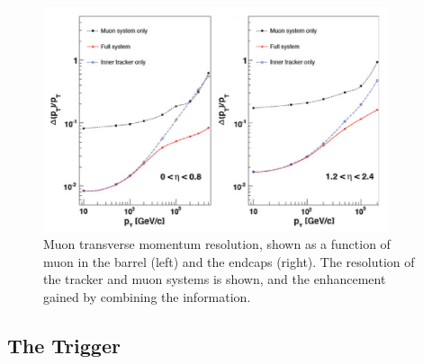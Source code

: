 \begin{figure}[htbp]
  \begin{center}
  \includegraphics[width=0.9\textwidth]{Figures/detector/CMSmuonRes}
  \caption{Muon transverse momentum resolution, shown as a function of muon \pt in the barrel (left) and the endcaps (right). The resolution of the tracker and muon systems is shown, and the enhancement gained by combining the information.
}
  \label{fig:CMSmuonRes}
  \end{center}
\end{figure}



\subsection{The Trigger}